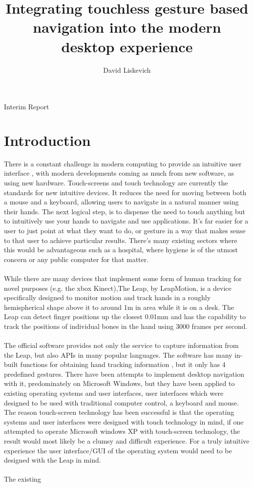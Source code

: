 \documentclass[a4paper]{article}
\title{Integrating touchless gesture based navigation into the modern desktop experience}
\author{
    David Liskevich 
  }
\date{}
\begin{document}
\maketitle

\begin{description}
\item [\centering Interim Report]
\end{description}

\newpage

\tableofcontents
\newpage

\section{Introduction}
There is a constant challenge in modern computing to provide an intuitive user interface , with modern developments coming as much from new software, as using new hardware. Touch-screens and touch technology are currently the standards for new intuitive devices. It reduces the need for moving between both a mouse and a  keyboard, allowing users to navigate in a natural manner using their hands. The next logical step, is to dispense the need to touch anything but to intuitively use your hands to navigate and use applications. It's far easier for a user to just point at what they want to do, or gesture in a way that  makes sense to that user to achieve particular results. There's many existing sectors where this would be advantageous such as a hospital, where hygiene is of the utmost concern or any public computer for that matter. \\ \\While there are many devices that implement some form of human tracking for novel purposes (e.g. the xbox Kinect),The Leap, by LeapMotion, is a device specifically  designed to monitor motion and track hands in a roughly  hemispherical shape above it to around 1m in area while it is on a desk. The Leap can detect finger positions up the closest 0.01mm\cite{accuracy} and has the capability to track the positions of individual bones in the hand using 3000 frames per second.\\ \\ The official software provides not only the service to capture information from the Leap, but also APIs in many popular languages. The software has many in-built functions for obtaining hand tracking information , but it only has 4 predefined gestures. There have been attempts to implement desktop navigation with it, predominately on Microsoft Windows, but they have been applied to existing operating systems and user interfaces, user interfaces which were designed to be used with traditional computer control, a keyboard and mouse. The reason touch-screen technology has been successful is that the operating systems and user interfaces were designed with touch technology in mind, if one attempted to operate Microsoft windows XP with touch-screen technology, the result would most likely be a clumsy and difficult experience. For a truly intuitive experience the user interface/GUI of the operating system would need to be designed with the Leap in mind. \\ \\The existing 
\end{document}
